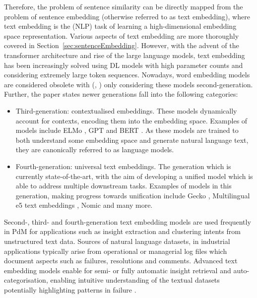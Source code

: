 \documentclass[10pt,oneside]{report}
\renewcommand{\citet}[1]{\citeauthor{#1}, \citeyear{#1}}
\begin{document}
Therefore, the problem of sentence similarity can be directly mapped from the problem of sentence embedding (otherwise referred to as text embedding), where text embedding is the (NLP) task of learning a high-dimensional embedding space representation. Various aspects of text embedding are more thoroughly covered in Section~\ref{sec:sentenceEmbedding}. However, with the advent of the transformer architecture \cite{vaswani2017attention} and rise of the large language models, text embedding has been increasingly solved using DL models with high parameter counts \cite{cao2024recent} and considering extremely large token sequences. Nowadays, word embedding models are considered obsolete with (\citet{cao2024recent}) only considering these models second-generation. Further, the paper states newer generations fall into the following categories:
\begin{itemize}
    \item Third-generation: contextualised embeddings. These models dynamically account for contexts, encoding them into the embedding space. Examples of models include ELMo \cite{sarzynska2021detecting}, GPT \cite{radford2018improving} and BERT \cite{devlin2019bert}. As these models are trained to both understand some embedding space and generate natural language text, they are canonically referred to as language models.
    \item Fourth-generation: universal text embeddings. The generation which is currently state-of-the-art, with the aim of developing a unified model which is able to address multiple downstream tasks. Examples of models in this generation, making progress towards unification include Gecko \cite{lee2024gecko}, Multilingual e5 text embeddings \cite{wang2024multilingual}, Nomic \cite{nussbaum2024nomic} and many more. 
\end{itemize}

Second-, third- and fourth-generation text embedding models are used frequently in PdM for applications such as insight extraction \cite{abijith2023large,usuga2022using} and clustering intents from unstructured text data. Sources of natural language datasets, in industrial applications typically arise from operational or managerial log files which document aspects such as failures, resolutions and comments. Advanced text embedding models enable for semi- or fully automatic insight retrieval and auto-categorisation, enabling intuitive understanding of the textual datasets potentially highlighting patterns in failure \cite{nota2022text}.
\end{document}
